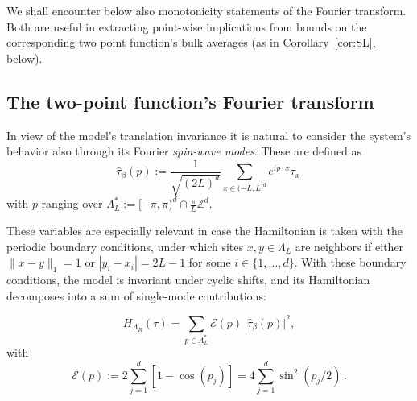 \documentclass[a4paper,oneside,11pt]{article}
\def\Z{\mathbb{Z}}                          %
\newcommand{\be}[1]{\begin{equation}\label{#1}}
\newcommand{\ee}{\end{equation}}
\numberwithin{equation}{section}
\numberwithin{equation}{section}
\numberwithin{equation}{section}
\def\Z{\mathbb{Z}}                          %
\def\be{\begin{equation}}
\def\ee{\end{equation}}
\begin{document}
We shall  encounter below also monotonicity statements of the Fourier transform.  Both are useful in extracting  point-wise implications from bounds on the corresponding two point function's bulk averages (as in  Corollary~\ref{cor:SL},  below).   

\subsection{The two-point function's Fourier transform} 


In view of the model's translation invariance it is natural to consider the system's behavior also through its Fourier \emph{spin-wave modes}.  These are defined as   
\be
\widehat \tau_\beta(p) := \frac{1}{\sqrt{(2L)^d} } \sum_{x\in (-L,L]^d}e^{ip\cdot x} \tau_x \, 
\ee 
with $p$ ranging over $\Lambda_L^*:=[-\pi,\pi)^d\cap\tfrac{\pi}{L}\Z^d$. 

 These variables are especially relevant in case the Hamiltonian is taken with the periodic boundary conditions, under which sites $x,y\in \Lambda_L$ are neighbors if either $\|x-y\|_1=1$ or  $|y_i-x_i |=  2L-1$ for some $i\in \{1,\dots,d\}$.   With these boundary conditions, the model is invariant under cyclic shifts, and its Hamiltonian decomposes into a sum of single-mode contributions: 

\be
H_{\Lambda_R}(\tau) = \sum_{p\in \Lambda_L^*} \mathcal E(p) \, \vert  \widehat \tau_\beta(p)\vert^2,
\ee 
with
\be 
\mathcal E(p) :=  2\sum_{j=1}^d [1- \cos(p_j)] = 4  \sum_{j=1}^d  \sin^2(p_j/2)\, .
\ee   
\end{document}
